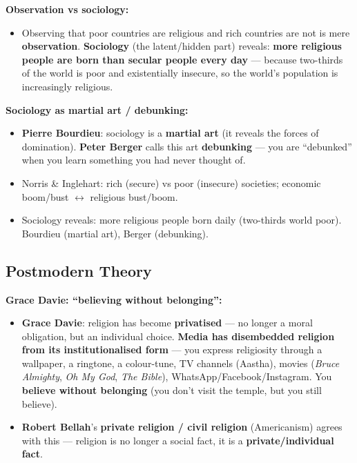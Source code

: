 \begin{DataFact}
\textbf{Observation vs sociology:}
\begin{itemize}
\item Observing that poor countries are religious and rich countries are not is mere \textbf{observation}. \textbf{Sociology} (the latent/hidden part) reveals: \textbf{more religious people are born than secular people every day} --- because two-thirds of the world is poor and existentially insecure, so the world's population is increasingly religious.
\end{itemize}
\end{DataFact}

\begin{CriticalPoint}
\textbf{Sociology as martial art / debunking:}
\begin{itemize}
\item \textbf{Pierre Bourdieu}: sociology is a \textbf{martial art} (it reveals the forces of domination). \textbf{Peter Berger} calls this art \textbf{debunking} --- you are ``debunked'' when you learn something you had never thought of.
\end{itemize}
\end{CriticalPoint}

\begin{QuickRevision}
\begin{itemize}
\item Norris \& Inglehart: rich (secure) vs poor (insecure) societies; economic boom/bust $\leftrightarrow$ religious bust/boom.
\item Sociology reveals: more religious people born daily (two-thirds world poor). Bourdieu (martial art), Berger (debunking).
\end{itemize}
\end{QuickRevision}

\sectiondivider

\subsection{Postmodern Theory}

\begin{KeyConcept}
\textbf{Grace Davie: ``believing without belonging'':}
\begin{itemize}
\item \textbf{Grace Davie}: religion has become \textbf{privatised} --- no longer a moral obligation, but an individual choice. \textbf{Media has disembedded religion from its institutionalised form} --- you express religiosity through a wallpaper, a ringtone, a colour-tune, TV channels (Aastha), movies (\textit{Bruce Almighty}, \textit{Oh My God}, \textit{The Bible}), WhatsApp/Facebook/Instagram. You \textbf{believe without belonging} (you don't visit the temple, but you still believe).
\item \textbf{Robert Bellah}'s \textbf{private religion / civil religion} (Americanism) agrees with this --- religion is no longer a social fact, it is a \textbf{private/individual fact}.
\end{itemize}
\end{KeyConcept}

